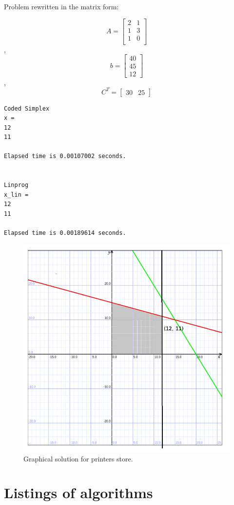 \documentclass[eng,openany]{mgr}
\begin{document}
Problem rewritten in the matrix form:

\[
A =
\begin{bmatrix}
2 & 1\\
1 & 3\\
1 & 0\\
\end{bmatrix}
\]
,
\[
b =
\begin{bmatrix}
40 \\ 45 \\ 12
\end{bmatrix}
\],
\[
C^T =
\begin{bmatrix}
30 & 25
\end{bmatrix}
\]

\begin{lstlisting}
Coded Simplex
x =
12
11

Elapsed time is 0.00107002 seconds.


Linprog
x_lin =
12
11

Elapsed time is 0.00189614 seconds.
\end{lstlisting}

\begin{figure}[h]
\centering
\includegraphics[width=0.5\linewidth]{screenshot014}
\caption{Graphical solution for printers store.}
\label{fig:screenshot014}
\end{figure}

\chapter{Listings of algorithms}
\end{document}
